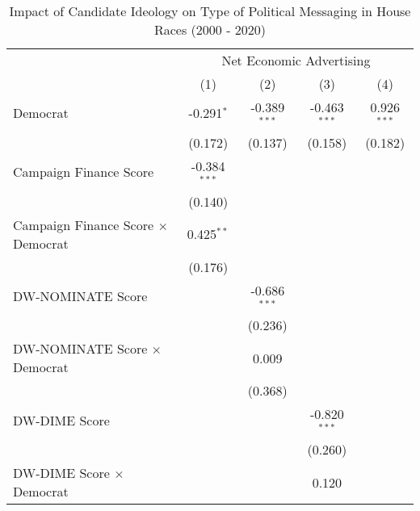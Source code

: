 
\begin{table}[htbp]
   \caption{Impact of Candidate Ideology on Type of Political Messaging in House Races (2000 - 2020)}
   \bigskip
   \centering
   \small
   \begin{tabular}{lcccc}
      \toprule
       & \multicolumn{4}{c}{Net Economic Advertising}\\
                                                                & (1)            & (2)            & (3)            & (4)\\  
      \midrule 
      Democrat                                                  & -0.291$^{*}$   & -0.389$^{***}$ & -0.463$^{***}$ & 0.926$^{***}$\\   
                                                                & (0.172)        & (0.137)        & (0.158)        & (0.182)\\   
      Campaign Finance Score                                    & -0.384$^{***}$ &                &                &   \\   
                                                                & (0.140)        &                &                &   \\   
      Campaign Finance Score $\times$ Democrat                  & 0.425$^{**}$   &                &                &   \\   
                                                                & (0.176)        &                &                &   \\   
      DW-NOMINATE Score                                         &                & -0.686$^{***}$ &                &   \\   
                                                                &                & (0.236)        &                &   \\   
      DW-NOMINATE Score $\times$ Democrat                       &                & 0.009          &                &   \\   
                                                                &                & (0.368)        &                &   \\   
      DW-DIME Score                                             &                &                & -0.820$^{***}$ &   \\   
                                                                &                &                & (0.260)        &   \\   
      DW-DIME Score $\times$ Democrat                           &                &                & 0.120          &   \\   

\end{tabular}
\end{table}
